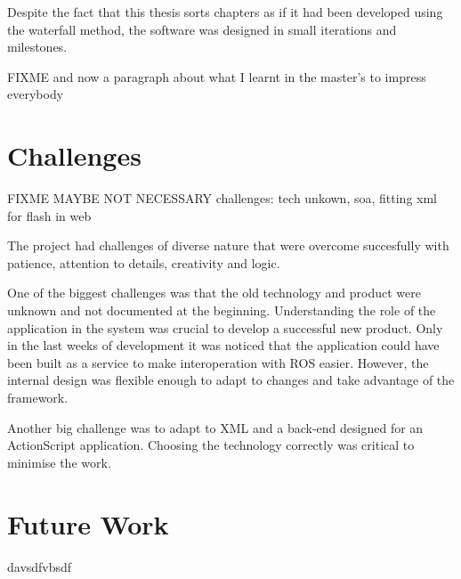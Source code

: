 Despite the fact that this thesis sorts chapters as if it had been developed using the waterfall method, the software was designed in small iterations and milestones.

FIXME and now a paragraph about what I learnt in the master's to impress everybody

\section{Challenges}
 FIXME MAYBE NOT NECESSARY
challenges: tech unkown, soa, fitting xml for flash in web

The project had challenges of diverse nature that were overcome succesfully with patience, attention to details, creativity and logic.

One of the biggest challenges was that the old technology and product were unknown and not documented at the beginning.
Understanding the role of the application in the system was crucial to develop a successful new product.
Only in the last weeks of development it was noticed that the application could have been built as a service to make interoperation with ROS easier.
However, the internal design was flexible enough to adapt to changes and take advantage of the framework.

Another big challenge was to adapt to \ac{XML} and a back-end designed for an ActionScript application.
Choosing the technology correctly was critical to minimise the work.




\section{Future Work}

davsdfvbsdf